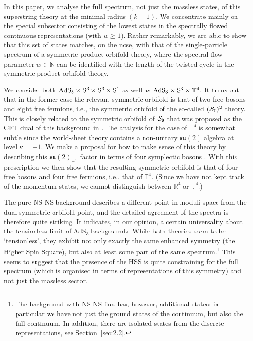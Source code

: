 \documentclass[12pt,a4paper]{article}
\begin{document}
In this paper, we analyse the full spectrum,  not just the massless states, of this superstring theory at the minimal radius $(k=1)$. We concentrate mainly on the special subsector consisting of the lowest states in the spectrally flowed continuous representations (with $w\geq 1$). 
Rather remarkably, we are able to show that this set of states matches, on the nose, with that of the single-particle spectrum of a symmetric product orbifold theory, where the spectral flow parameter $w \in \mathbb{N}$ can be identified with the length of the twisted cycle in the symmetric product orbifold theory. 

We consider both ${\rm AdS}_3\times {\rm S}^3 \times {\rm S}^3 \times {\rm S}^1$ as well as ${\rm AdS}_3 \times {\rm S}^3 \times \mathbb{T}^4$. It turns out that in the former case the relevant symmetric orbifold is that of two free bosons and eight free fermions, i.e., the symmetric orbifold of the so-called $({\cal S}_0)^2$ theory. This is closely related to the symmetric orbifold of ${\cal S}_0$ that was proposed as the CFT dual of this background in \cite{Eberhardt:2017pty}. The analysis for the case of $\mathbb{T}^4$ is somewhat subtle since the world-sheet theory contains a non-unitary $\mathfrak{su}(2)$ algebra at level $\kappa=-1$. We make a proposal for how to make sense of this theory by describing this $\mathfrak{su}(2)_{-1}$ factor in terms of four symplectic bosons \cite{Goddard:1987td}. With this prescription we then show that the resulting symmetric orbifold is that of four free bosons and four free fermions, i.e., that of ${\mathbb T}^4$. (Since we have not kept track of the momentum states, we cannot distinguish between ${\mathbb R}^4$ or ${\mathbb T}^4$.)

The pure NS-NS background describes a different point in moduli space from the dual symmetric orbifold point, and the detailed agreement of the spectra is therefore quite striking. It indicates, in our opinion, a certain universality about the tensionless limit of AdS$_3$ backgrounds. While both theories seem to be `tensionless', they exhibit not only exactly the same enhanced symmetry (the Higher Spin Square), but also at least some part of the same spectrum.\footnote{The background with NS-NS flux has, however, additional states: in particular we have not just the ground states of the continuum, but also the full continuum. In addition, there are isolated states from the discrete representations, see Section~\ref{sec:2.2}.} This seems to suggest that the presence of the HSS is quite constraining for the full spectrum (which is organised in terms of representations of this symmetry) and not just the massless sector. 
\end{document}
